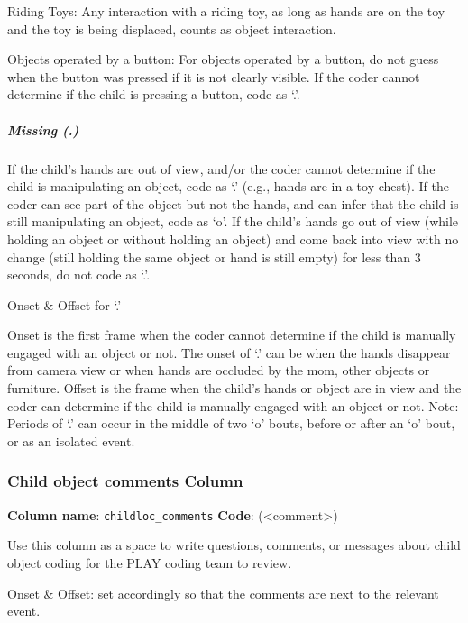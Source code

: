 \documentclass[
  12pt,
]{book}
\begin{document}
Riding Toys: Any interaction with a riding toy, as long as hands are on the toy and the toy is being displaced, counts as object interaction.

Objects operated by a button: For objects operated by a button, do not guess when the button was pressed if it is not clearly visible. If the coder cannot determine if the child is pressing a button, code as `.'.

\hypertarget{child_hands_off_camera}{%
\subparagraph*{Missing (.)}\label{child_hands_off_camera}}

If the child's hands are out of view, and/or the coder cannot determine if the child is manipulating an object, code as `.' (e.g., hands are in a toy chest). If the coder can see part of the object but not the hands, and can infer that the child is still manipulating an object, code as `o'.
If the child's hands go out of view (while holding an object or without holding an object) and come back into view with no change (still holding the same object or hand is still empty) for less than 3 seconds, do not code as `.'.

Onset \& Offset for `.'

Onset is the first frame when the coder cannot determine if the child is manually engaged with an object or not. The onset of `.' can be when the hands disappear from camera view or when hands are occluded by the mom, other objects or furniture.
Offset is the frame when the child's hands or object are in view and the coder can determine if the child is manually engaged with an object or not.
Note: Periods of `.' can occur in the middle of two `o' bouts, before or after an `o' bout, or as an isolated event.

\hypertarget{child-object-comments-column}{%
\subsubsection*{Child object comments Column}\label{child-object-comments-column}}

\textbf{Column name}: \texttt{childloc\_comments}
\textbf{Code}: (\textless comment\textgreater)

Use this column as a space to write questions, comments, or messages about child object coding for the PLAY coding team to review.

Onset \& Offset: set accordingly so that the comments are next to the relevant event.
\end{document}
